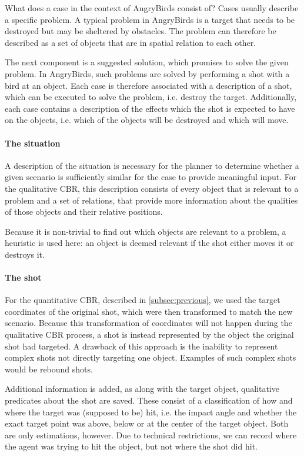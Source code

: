 What does a case in the context of AngryBirds consist of?
Cases usually describe a specific problem.
A typical problem in AngryBirds is a target that needs to be destroyed but may be sheltered by obstacles.
The problem can therefore be described as a set of objects that are in spatial relation to each other.

The next component is a suggested solution, which promises to solve the given problem.
In AngryBirds, such problems are solved by performing a shot with a bird at an object. Each case is therefore associated with a description of a shot, which can be executed to solve the problem, i.e. destroy the target.
Additionally, each case contains a description of the effects which the shot is expected to have on the objects, i.e. which of the objects will be destroyed and which will move.

\paragraph{The situation}
A description of the situation is necessary for the planner to determine whether a given scenario is sufficiently similar for the case to provide meaningful input.
For the qualitative \ac{CBR}, this description consists of every object that is relevant to a problem and a set of relations, that provide more information about the qualities of those objects and their relative positions.

Because it is non-trivial to find out which objects are relevant to a problem, a heuristic is used here: an object is deemed relevant if the shot either moves it or destroys it.


\paragraph{The shot}
For the quantitative \ac{CBR}, described in \ref{subsec:previous}, we used the target coordinates of the original shot, which were then transformed to match the new scenario.
Because this transformation of coordinates will not happen during the qualitative CBR process, a shot is instead represented by the object the original shot had targeted.
A drawback of this approach is the inability to represent complex shots not directly targeting one object.
Examples of such complex shots would be rebound shots.

Additional information is added, as along with the target object, qualitative predicates about the shot are saved. 
These consist of a classification of how and where the target was (supposed to be) hit, i.e. the impact angle and whether the exact target point was above, below or at the center of the target object.
Both are only estimations, however. Due to technical restrictions, we can record where the agent was trying to hit the object, but not where the shot did hit.

